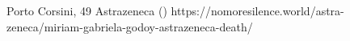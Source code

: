           {Porto Corsini, }
          {49}
          {Astrazeneca}
          {}
          {
             ()
          }
          {https://nomoresilence.world/astra-zeneca/miriam-gabriela-godoy-astrazeneca-death/}


